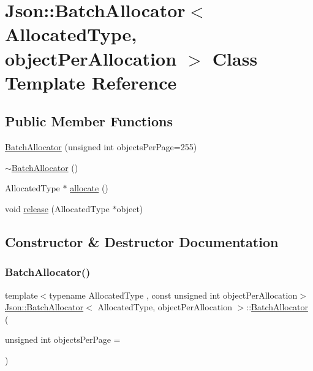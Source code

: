\hypertarget{class_json_1_1_batch_allocator}{}\section{Json\+:\+:Batch\+Allocator$<$ Allocated\+Type, object\+Per\+Allocation $>$ Class Template Reference}
\label{class_json_1_1_batch_allocator}
\subsection*{Public Member Functions}
\begin{DoxyCompactItemize}
\item 
\mbox{\hyperlink{class_json_1_1_batch_allocator_a96aae4d9032847b074e72a0cf32bc9ea}{Batch\+Allocator}} (unsigned int objects\+Per\+Page=255)
\item 
\mbox{\hyperlink{class_json_1_1_batch_allocator_a823a98097ec40ccc8d88da9378be228d}{$\sim$\+Batch\+Allocator}} ()
\item 
Allocated\+Type $\ast$ \mbox{\hyperlink{class_json_1_1_batch_allocator_a4909756c2d33bd0f07662e88e4f850dd}{allocate}} ()
\item 
void \mbox{\hyperlink{class_json_1_1_batch_allocator_aceb116aceb6bb5bbcfd05433abc04ba5}{release}} (Allocated\+Type $\ast$object)
\end{DoxyCompactItemize}


\subsection{Constructor \& Destructor Documentation}
\mbox{\label{class_json_1_1_batch_allocator_a96aae4d9032847b074e72a0cf32bc9ea}} 
\subsubsection{\texorpdfstring{Batch\+Allocator()}{BatchAllocator()}}
{\footnotesize\ttfamily template$<$typename Allocated\+Type , const unsigned int object\+Per\+Allocation$>$ \\
\mbox{\hyperlink{class_json_1_1_batch_allocator}{Json\+::\+Batch\+Allocator}}$<$ Allocated\+Type, object\+Per\+Allocation $>$\+::\mbox{\hyperlink{class_json_1_1_batch_allocator}{Batch\+Allocator}} (\begin{DoxyParamCaption}\item[{unsigned int}]{objects\+Per\+Page = {} }\end{DoxyParamCaption})\hspace{0.3cm}{\ttfamily [inline]}}

